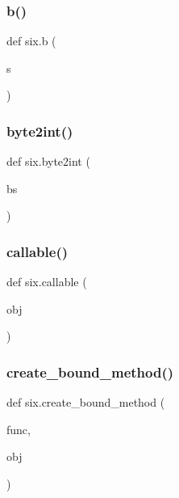 \subsubsection{\texorpdfstring{b()}{b()}}
{\footnotesize\ttfamily def six.\+b (\begin{DoxyParamCaption}\item[{}]{s }\end{DoxyParamCaption})}

\mbox{\label{namespacesix_ab6989579e9c8ed97ab707bc951f25dd2}} 
\subsubsection{\texorpdfstring{byte2int()}{byte2int()}}
{\footnotesize\ttfamily def six.\+byte2int (\begin{DoxyParamCaption}\item[{}]{bs }\end{DoxyParamCaption})}

\mbox{\label{namespacesix_a136c01fffede39c0dc0f4df67f57632f}} 
\subsubsection{\texorpdfstring{callable()}{callable()}}
{\footnotesize\ttfamily def six.\+callable (\begin{DoxyParamCaption}\item[{}]{obj }\end{DoxyParamCaption})}

\mbox{\label{namespacesix_a84be7bb1ab8be3e70269a536e0625503}} 
\subsubsection{\texorpdfstring{create\+\_\+bound\+\_\+method()}{create\_bound\_method()}}
{\footnotesize\ttfamily def six.\+create\+\_\+bound\+\_\+method (\begin{DoxyParamCaption}\item[{}]{func,  }\item[{}]{obj }\end{DoxyParamCaption})}

